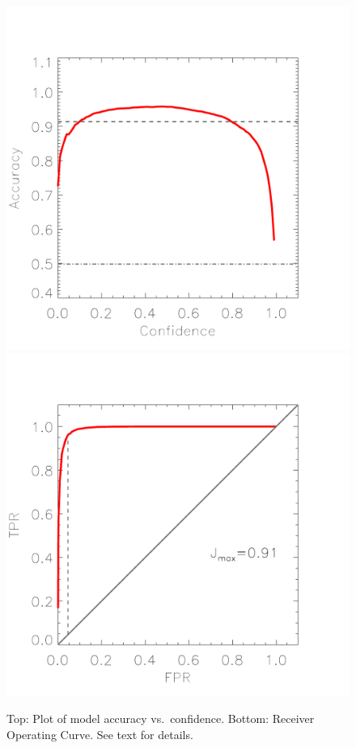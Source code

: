 \documentclass[apjl]{emulateapj}
\begin{document}
\begin{figure}[h!]
\centering
\includegraphics[scale=0.4]{fig2a.pdf} \includegraphics[scale=0.4]{fig2b.pdf}
\caption{Top: {Plot of model accuracy vs.~confidence}. Bottom: {Receiver Operating Curve. See text for details}.\label{figures}}
\end{figure}
\end{document}
